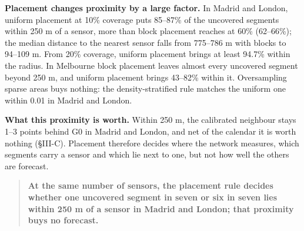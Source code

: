 \textbf{Placement changes proximity by a large factor.} In Madrid and London, uniform placement at 10\% coverage puts 85–87\% of the uncovered segments within 250 m of a sensor, more than block placement reaches at 60\% (62–66\%); the median distance to the nearest sensor falls from 775–786 m with blocks to 94–109 m. From 20\% coverage, uniform placement brings at least 94.7\% within the radius. In Melbourne block placement leaves almost every uncovered segment beyond 250 m, and uniform placement brings 43–82\% within it. Oversampling sparse areas buys nothing: the density-stratified rule matches the uniform one within 0.01 in Madrid and London.

\textbf{What this proximity is worth.} Within 250 m, the calibrated neighbour stays 1–3 points behind G0 in Madrid and London, and net of the calendar it is worth nothing (§III-C). Placement therefore decides where the network measures, which segments carry a sensor and which lie next to one, but not how well the others are forecast.

\begin{quote}
\textbf{At the same number of sensors, the placement rule decides whether one uncovered segment in seven or six in seven lies within 250 m of a sensor in Madrid and London; that proximity buys no forecast.}
\end{quote}

